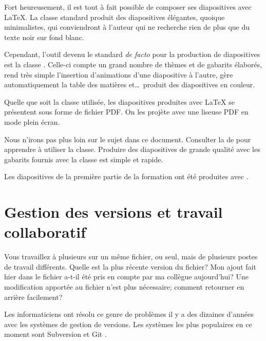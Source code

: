 Fort heureusement, il est tout à fait possible de composer ses
diapositives avec {\LaTeX}. La classe standard  produit
des diapositives élégantes, quoique minimalistes, qui conviendront à
l'auteur qui ne recherche rien de plus que du texte noir sur fond
blanc.

Cependant, l'outil devenu le standard \emph{de facto} pour la
production de diapositives est la classe 
\citep{beamer}. Celle-ci compte un grand nombre de thèmes et de
gabarits élaborés, rend très simple l'insertion d'animations d'une
diapositive à l'autre, gère automatiquement la table des matières
et\dots\ produit des diapositives en couleur.

Quelle que soit la classe utilisée, les diapositives produites avec
{\LaTeX} se présentent sous forme de fichier PDF. On les projète avec
une liseuse PDF en mode plein écran.

Nous n'irons pas plus loin sur le sujet dans ce document. Consulter
la %
de  pour apprendre à utiliser la classe. Produire des
diapositives de grande qualité avec les gabarits fournis avec la
classe est simple et rapide.

Les diapositives de la première partie de la formation
\citep{UL:latex:1} ont été produites avec .



\section{Gestion des versions et travail collaboratif}
\label{sec:trucs:cvs}

Vous travaillez à plusieurs sur un même fichier, ou seul, mais de
plusieurs postes de travail différents. Quelle est la plus récente
version du fichier? Mon ajout fait hier dans le fichier a-t-il été
pris en compte par ma collègue aujourd'hui? Une modification apportée
au fichier n'est plus nécessaire; comment retourner en arrière
facilement?

Les informaticiens ont résolu ce genre de problèmes il y a des
dizaines d'années avec les systèmes de gestion de versions. Les
systèmes les plus populaires en ce moment sont Subversion
\citep{subversion} et Git \citep{git}.

